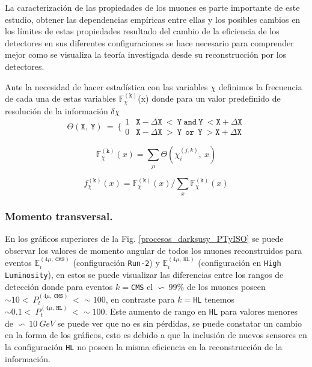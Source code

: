 La caracterización de las propiedades de los muones es parte importante de este estudio, obtener las dependencias empíricas entre ellas y los posibles cambios en los límites de estas propiedades resultado del cambio de la eficiencia de los detectores en sus diferentes configuraciones se hace necesario para comprender mejor como se visualiza la teoría investigada desde su reconstrucción por los detectores.



Ante la necesidad de hacer estadística con las variables $\chi$ definimos la frecuencia de cada una de estas variables $\mathbb{F}_\chi^{(\mathtt{k})}$(x) donde para un valor predefinido de resolución de la información $\delta \chi$
\begin{equation}
\mathtt{\Theta(X,~Y)} ~ = ~ \Bigg\{\begin{matrix}
1 & \mathtt{X-\Delta X ~<~Y ~and~Y~ < X+\Delta X}\\
0 & \mathtt{X-\Delta X ~>~Y ~~or~~Y~ > X+\Delta X}
\end{matrix} 
\end{equation}

\begin{equation}
\mathbb{F}_\chi^{(\mathtt{k})} (x)= \sum_{ji} \mathtt{\Theta}(\chi_i^{(j,k)},~x)
\end{equation}

\begin{equation}
f_\chi^{(\mathtt{k})} (x)= \mathbb{F}_\chi^{(\mathtt{k})} (x)/ \sum_x \mathbb{F}_\chi^{(\mathtt{k})} (x)
\end{equation}



\subsubsection{Momento transversal.}
En los gráficos superiores de la Fig. \ref{procesos_darksusy_PTyISO} se puede observar los valores de momento angular de todos los muones reconstruidos para eventos $\mathbb{E}_i^{(4\mu,~\mathtt{CMS})}$ (configuración \texttt{Run-2}) y $\mathbb{E}_i^{(4\mu,~\mathtt{HL})}$ (configuración en \texttt{High Luminosity}), en estos se puede visualizar las diferencias entre los rangos de detección donde para eventos $k=$\texttt{CMS} el $\backsim ~ 99\%$ de los muones poseen $\sim 10  < ~ P_t^{(4\mu,~\mathtt{CMS})} ~ <\sim 100$, en contraste para $k=$\texttt{HL} tenemos $\sim 0.1 < ~ P_t^{(4\mu,~\mathtt{HL})} ~ < \sim 100$. Este aumento de rango en \texttt{HL} para valores menores de $\backsim ~ 10~GeV$ se puede ver que no es sin pérdidas, se puede constatar un cambio en la forma de los gráficos, esto es debido a que la inclusión de nuevos sensores en la configuración \texttt{HL} no poseen la misma eficiencia en la reconstrucción de la información.

